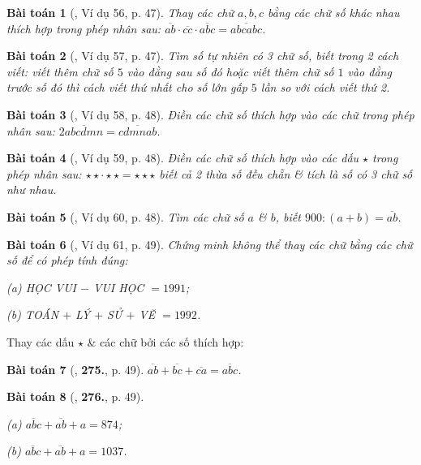 \documentclass{article}
\numberwithin{equation}{section}
\newtheorem{baitoan}{Bài toán}
\begin{document}
\begin{baitoan}[\cite{Binh_Toan_6_tap_1}, Ví dụ 56, p. 47]
	Thay các chữ $a,b,c$ bằng các chữ số khác nhau thích hợp trong phép nhân sau: $\overline{ab}\cdot\overline{cc}\cdot\overline{abc} = \overline{abcabc}$.
\end{baitoan}

\begin{baitoan}[\cite{Binh_Toan_6_tap_1}, Ví dụ 57, p. 47]
	Tìm số tự nhiên có 3 chữ số, biết trong 2 cách viết: viết thêm chữ số $5$ vào đằng sau số đó hoặc viết thêm chữ số $1$ vào đằng trước số đó thì cách viết thứ nhất cho số lớn gấp $5$ lần so với cách viết thứ 2.
\end{baitoan}

\begin{baitoan}[\cite{Binh_Toan_6_tap_1}, Ví dụ 58, p. 48]
	Điền các chữ số thích hợp vào các chữ trong phép nhân sau: $2\overline{abcdmn} = \overline{cdmnab}$.
\end{baitoan}

\begin{baitoan}[\cite{Binh_Toan_6_tap_1}, Ví dụ 59, p. 48]
	Điền các chữ số thích hợp vào các dấu $\star$ trong phép nhân sau: $\star\star\cdot\star\star = \star\star\star$ biết cả 2 thừa số đều chẵn \& tích là số có 3 chữ số như nhau.
\end{baitoan}

\begin{baitoan}[\cite{Binh_Toan_6_tap_1}, Ví dụ 60, p. 48]
	Tìm các chữ số $a$ \& $b$, biết $900:(a + b) = \overline{ab}$.
\end{baitoan}

\begin{baitoan}[\cite{Binh_Toan_6_tap_1}, Ví dụ 61, p. 49]
	Chứng minh không thể thay các chữ bằng các chữ số để có phép tính đúng:
	\begin{enumerate*}
		\item[(a)] \emph{HỌC VUI $-$ VUI HỌC} $= 1991$;
		\item[(b)] \emph{TOÁN $+$ LÝ $+$ SỬ $+$ VẼ} $= 1992$.
	\end{enumerate*}
\end{baitoan}
Thay các dấu $\star$ \& các chữ bởi các số thích hợp:

\begin{baitoan}[\cite{Binh_Toan_6_tap_1}, \textbf{275.}, p. 49]
	$\overline{ab} + \overline{bc} + \overline{ca} = \overline{abc}$.
\end{baitoan}

\begin{baitoan}[\cite{Binh_Toan_6_tap_1}, \textbf{276.}, p. 49]
	\begin{enumerate*}
		\item[(a)] $\overline{abc} + \overline{ab} + a = 874$;
		\item[(b)] $\overline{abc} + \overline{ab} + a = 1037$.
	\end{enumerate*}
\end{baitoan}
\end{document}
